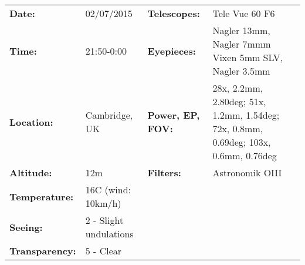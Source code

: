 \begin{tabular}{ p{0.9in} p{1.3in} p{1.2in} p{5.2in}}
{\bf Date:} & 02/07/2015 & {\bf Telescopes:} & Tele Vue 60 F6 \\ 
{\bf Time:} & 21:50-0:00 & {\bf Eyepieces:} & Nagler 13mm, Nagler 7mmm Vixen 5mm SLV, Nagler 3.5mm \\ 
{\bf Location:} & Cambridge, UK & {\bf Power, EP, FOV:} & 28x, 2.2mm, 2.80deg; 51x, 1.2mm, 1.54deg; 72x, 0.8mm, 0.69deg; 103x, 0.6mm, 0.76deg \\ 
{\bf Altitude:} & 12m & {\bf Filters:} & Astronomik OIII \\ 
{\bf Temperature:} & 16C (wind: 10km/h) & & \\ 
{\bf Seeing:} & 2 - Slight undulations & & \\ 
{\bf Transparency:} & 5 - Clear & & \\ 
\end{tabular}
